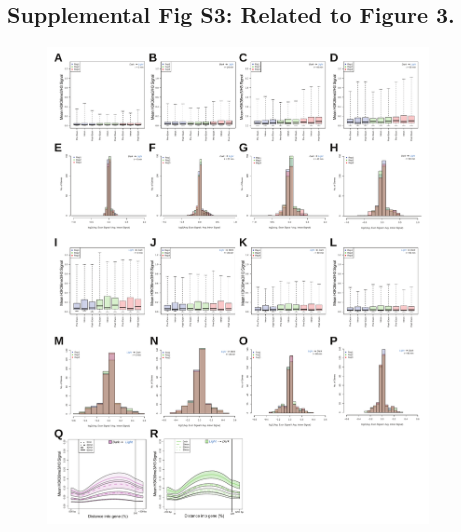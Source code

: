 \documentclass[11pt]{biorxiv}
\begin{document}
\subsection{Supplemental Fig S3: Related to Figure 3.}
\begin{figure}[ht!]
\center
\includegraphics[width=0.9\textwidth, trim={0in 0in 0in 0in}, clip]{figures/Supplemental_Fig_S3_compressed.pdf}
\end{figure}
\end{document}
